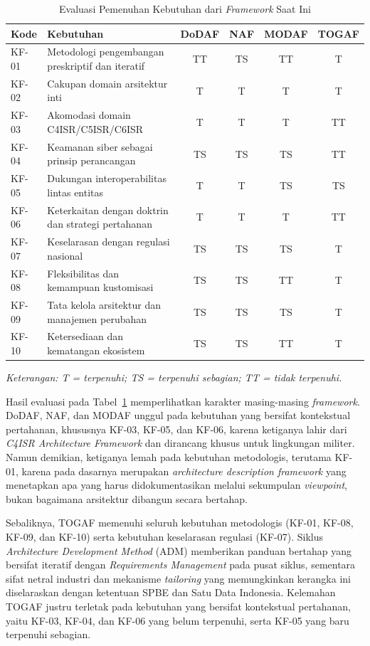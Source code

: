 \begin{table}[htbp]
\caption{Evaluasi Pemenuhan Kebutuhan dari \textit{Framework} Saat Ini}
\label{tab:evaluasi-framework}
\centering
\begin{tabular}{@{}p{}p{}cccc@{}}
\toprule
\textbf{Kode} & \textbf{Kebutuhan} & \textbf{DoDAF} & \textbf{NAF} & \textbf{MODAF} & \textbf{TOGAF}\\
\midrule
KF-01 & Metodologi pengembangan preskriptif dan iteratif & TT & TS & TT & T\\
KF-02 & Cakupan domain arsitektur inti & T & T & T & T\\
KF-03 & Akomodasi domain C4ISR/C5ISR/C6ISR & T & T & T & TT\\
KF-04 & Keamanan siber sebagai prinsip perancangan & TS & TS & TS & TT\\
KF-05 & Dukungan interoperabilitas lintas entitas & T & T & TS & TS\\
KF-06 & Keterkaitan dengan doktrin dan strategi pertahanan & T & T & T & TT\\
KF-07 & Keselarasan dengan regulasi nasional & TS & TS & TS & T\\
KF-08 & Fleksibilitas dan kemampuan kustomisasi & TS & TS & TT & T\\
KF-09 & Tata kelola arsitektur dan manajemen perubahan & TS & TS & TS & T\\
KF-10 & Ketersediaan dan kematangan ekosistem & TS & TS & TT & T\\
\bottomrule
\end{tabular}

\vspace{4pt}
{\footnotesize\textit{Keterangan: T = terpenuhi; TS = terpenuhi sebagian; TT = tidak terpenuhi.}}
\end{table}

Hasil evaluasi pada Tabel~\ref{tab:evaluasi-framework} memperlihatkan karakter masing-masing \textit{framework}. DoDAF, NAF, dan MODAF unggul pada kebutuhan yang bersifat kontekstual pertahanan, khususnya KF-03, KF-05, dan KF-06, karena ketiganya lahir dari \textit{C4ISR Architecture Framework} dan dirancang khusus untuk lingkungan militer. Namun demikian, ketiganya lemah pada kebutuhan metodologis, terutama KF-01, karena pada dasarnya merupakan \textit{architecture description framework} yang menetapkan apa yang harus didokumentasikan melalui sekumpulan \textit{viewpoint}, bukan bagaimana arsitektur dibangun secara bertahap.

Sebaliknya, TOGAF memenuhi seluruh kebutuhan metodologis (KF-01, KF-08, KF-09, dan KF-10) serta kebutuhan keselarasan regulasi (KF-07). Siklus \textit{Architecture Development Method} (ADM) memberikan panduan bertahap yang bersifat iteratif dengan \textit{Requirements Management} pada pusat siklus, sementara sifat netral industri dan mekanisme \textit{tailoring} yang memungkinkan kerangka ini diselaraskan dengan ketentuan SPBE dan Satu Data Indonesia. Kelemahan TOGAF justru terletak pada kebutuhan yang bersifat kontekstual pertahanan, yaitu KF-03, KF-04, dan KF-06 yang belum terpenuhi, serta KF-05 yang baru terpenuhi sebagian.

